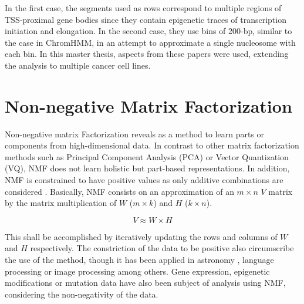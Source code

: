 \medskip

In the first case, the segments used as rows correspond to multiple regions of TSS-proximal gene bodies since they contain epigenetic traces of transcription initiation and elongation. In the second case, they use bins of 200-bp, similar to the case in ChromHMM, in an attempt to approximate a single nucleosome with each bin. In this master thesis, aspects from these papers were used, extending the analysis to multiple cancer cell lines.


\section{Non-negative Matrix Factorization}

Non-negative matrix Factorization reveals as a method to learn parts or components from high-dimensional data. In contrast to other matrix factorization methods such as Principal Component Analysis (PCA) or Vector Quantization (VQ), NMF does not learn holistic but part-based representations. In addition, NMF is constrained to have positive values as only additive combinations are considered \cite{Lee1999}. Basically, NMF consists on an approximation of an \(m \times n\) \(V\) matrix by the matrix multiplication of \(W\) (\(m \times k\)) and \(H\) (\(k \times n\)).

\begin{equation}
    V \approx W \times H
\end{equation}

This shall be accomplished by iteratively updating the rows and columns of \(W\) and \(H\) respectively. The constriction of the data to be positive also circumscribe the use of the method, though it has been applied in astronomy \cite{Ren2017}, language processing \cite{Bertin2010} or image processing \cite{Yang2007} among others. Gene expression, epigenetic modifications or mutation data have also been subject of analysis using NMF, considering the non-negativity of the data.

\medskip

